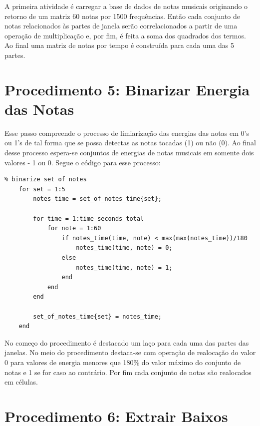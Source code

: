 A primeira atividade é carregar a base de dados de notas musicais originando o retorno de um matriz 60 notas por 1500 frequências. Então cada conjunto de notas relacionados às partes de janela serão correlacionados a partir de uma operação de multiplicação e, por fim, é feita a soma dos quadrados dos termos. Ao final uma matriz de notas por tempo é construída para cada uma das 5 partes.

\section{Procedimento 5: Binarizar Energia das Notas}

Esse passo compreende o processo de limiarização das energias das notas em 0's ou 1's de tal forma que se possa detectas as notas tocadas (1) ou não (0). Ao final desse processo espera-se conjuntos de energias de notas musicais em somente dois valores - 1 ou 0. Segue o código para esse processo:
\begin{lstlisting}
% binarize set of notes
    for set = 1:5
        notes_time = set_of_notes_time{set};
        
        for time = 1:time_seconds_total
            for note = 1:60
                if notes_time(time, note) < max(max(notes_time))/180
                    notes_time(time, note) = 0;
                else
                    notes_time(time, note) = 1;
                end
            end
        end

        set_of_notes_time{set} = notes_time;
    end
\end{lstlisting}

No começo do procedimento é destacado um laço para cada uma das partes das janelas. No meio do procedimento destaca-se com operação de realocação do valor 0 para valores de energia menores que 180\% do valor máximo do conjunto de notas e 1 se for caso ao contrário. Por fim cada conjunto de notas são realocados em células.

\section{Procedimento 6: Extrair Baixos}

